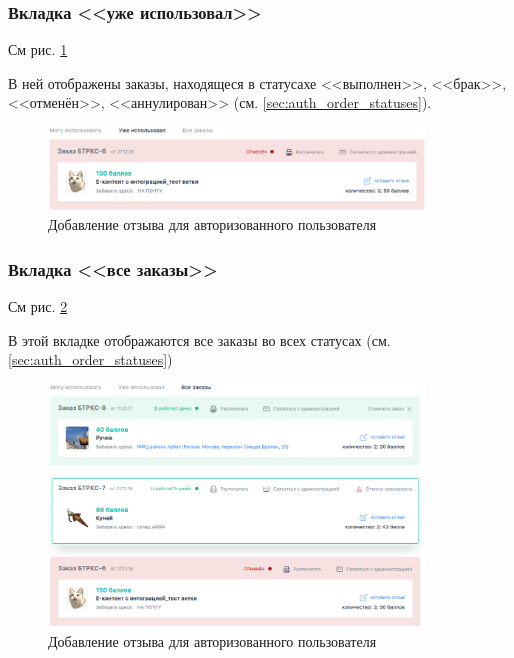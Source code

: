             \subsubsection{Вкладка <<уже использовал>>}
            \label{sec:auth_orders_already_use}
            См рис. \ref{fig:auth_orders_already_use}

            В ней отображены заказы, находящеся в статусахе
            <<выполнен>>, <<брак>>, <<отменён>>, <<аннулирован>> (см.
            \ref{sec:auth_order_statuses}).

            \begin{figure}
                \center
                \includegraphics[width=100mm]{04_auth_funcs/figures/09.eps}
                \caption{Добавление отзыва для авторизованного пользователя}
                \label{fig:auth_orders_already_use}
            \end{figure}

            \subsubsection{Вкладка <<все заказы>>}
                \par{
                См рис. \ref{fig:auth_orders_all_use}

                В этой вкладке отображаются все заказы во всех статусах
                (см. \ref{sec:auth_order_statuses})
                }
            \begin{figure}
                \center
                \includegraphics[width=100mm]{04_auth_funcs/figures/10.eps}
                \caption{Добавление отзыва для авторизованного пользователя}
                \label{fig:auth_orders_all_use}
            \end{figure}

